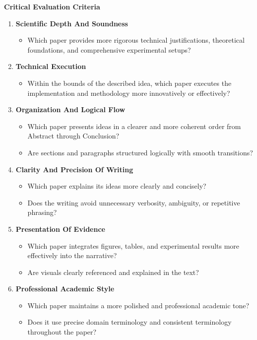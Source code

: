 \vspace{1em}
\noindent\textbf{Critical Evaluation Criteria}
\begin{enumerate}
    \item \textbf{Scientific Depth And Soundness}
    \begin{itemize}
        \item Which paper provides more rigorous technical justifications, theoretical foundations, and comprehensive experimental setups?
    \end{itemize}
    \item \textbf{Technical Execution}
    \begin{itemize}
        \item Within the bounds of the described idea, which paper executes the implementation and methodology more innovatively or effectively?
    \end{itemize}
    \item \textbf{Organization And Logical Flow}
    \begin{itemize}
        \item Which paper presents ideas in a clearer and more coherent order from Abstract through Conclusion?
        \item Are sections and paragraphs structured logically with smooth transitions?
    \end{itemize}
    \item \textbf{Clarity And Precision Of Writing}
    \begin{itemize}
        \item Which paper explains its ideas more clearly and concisely?
        \item Does the writing avoid unnecessary verbosity, ambiguity, or repetitive phrasing?
    \end{itemize}
    \item \textbf{Presentation Of Evidence}
    \begin{itemize}
        \item Which paper integrates figures, tables, and experimental results more effectively into the narrative?
        \item Are visuals clearly referenced and explained in the text?
    \end{itemize}
    \item \textbf{Professional Academic Style}
    \begin{itemize}
        \item Which paper maintains a more polished and professional academic tone?
        \item Does it use precise domain terminology and consistent terminology throughout the paper?
    \end{itemize}
\end{enumerate}

